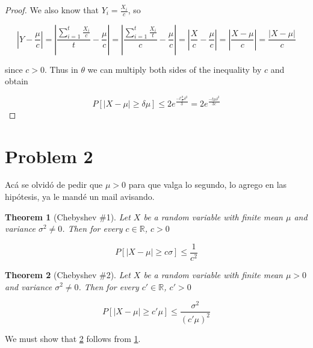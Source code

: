 \documentclass[11pt]{amsart}
\newtheorem{theorem}{Theorem}[section]
\begin{document}
\begin{proof}
We also know that $Y_i = \frac{X_i}{c}$, so 

$$\left|Y - \frac{\mu}{c}\right| = 
\left|\frac{\sum_{i=1}^t \frac{X_i}{c}}{t} - \frac{\mu}{c}\right| = 
\left|\frac{\sum_{i=1}^t \frac{X_i}{t}}{c} - \frac{\mu}{c}\right| = 
\left|\frac{X}{c} - \frac{\mu}{c}\right| = \left|\frac{X - \mu}{c}\right| = \frac{\left|X - \mu\right|}{c}$$

since $c > 0$. Thus in $\theta$ we can multiply both sides of the inequality by $c$ and obtain

$$
P\left[\left|X - \mu\right| \ge \delta \mu\right] \le 2 e^{\frac{-t \frac{\mu}{c} \delta^2}{3}} = 2 e^{\frac{-t \mu \delta^2}{3c}}
$$


\end{proof}



\bigskip
\section*{Problem 2}
\addtocounter{section}{1}
\setcounter{theorem}{0}

{\color{red}
Acá se olvidó de pedir que $\mu > 0$ para que valga lo segundo, lo agrego en las hipótesis, ya le mandé un mail avisando.
}

\begin{theorem}[Chebyshev \#1]\label{cheb1}
Let $X$ be a random variable with finite mean $\mu$ and variance $\sigma^2 \ne 0$. Then for every $c \in \mathbb{R}$, $c > 0$

$$
P\left[|X - \mu| \ge c \sigma\right] \le \frac{1}{c^2}
$$
\end{theorem}
\medskip

\begin{theorem}[Chebyshev \#2]\label{cheb2}
Let $X$ be a random variable with finite mean $\mu > 0$ and variance $\sigma^2 \ne 0$. Then for every $c' \in \mathbb{R}$, $c' > 0$

$$
P\left[|X - \mu| \ge c' \mu\right] \le \frac{\sigma^2}{(c'\mu)^2}
$$
\end{theorem}
\medskip

We must show that \ref{cheb2} follows from \ref{cheb1}.
\bigskip
\end{document}
